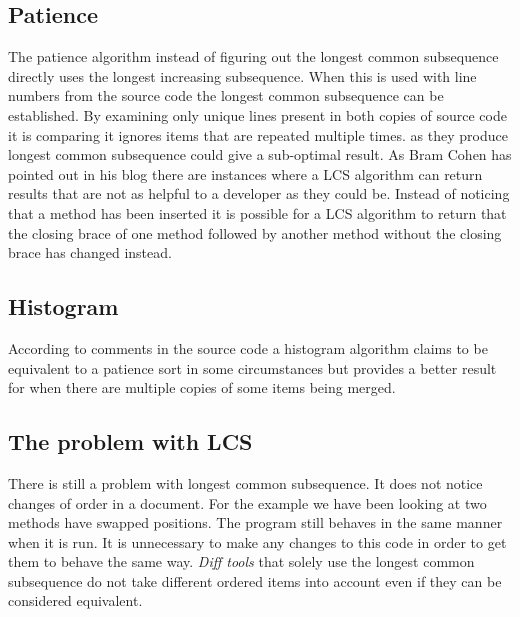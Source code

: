 
\subsection{Patience}
The patience algorithm instead of figuring out the longest common subsequence directly uses the longest increasing subsequence.
When this is used with line numbers from the source code the longest common subsequence can be established.
By examining only unique lines present in both copies of source code it is comparing it ignores items that are repeated multiple times.  as they produce longest common subsequence could give a sub-optimal result.
As Bram Cohen has pointed out in his blog there are instances where a LCS algorithm can return results that are not as helpful to a developer as they could be.  Instead of noticing that a method has been inserted it is possible for a LCS algorithm to return that the closing brace of one method followed by another method without the closing brace has changed instead.  
% 
% 

\subsection{Histogram}
According to comments in the source code a histogram algorithm claims to be equivalent to a patience sort in some circumstances but provides a better result for when there are multiple copies of some items being merged. 


\subsection{The problem with LCS}
There is still a problem with longest common subsequence. It does not notice changes of order in a document.  For the example we have been looking at two methods have swapped positions.  The program still behaves in the same manner when it is run.  It is unnecessary to make any changes to this code in order to get them to behave the same way. \emph{Diff tools} that solely use the longest common subsequence do not take different ordered items into account even if they can be considered equivalent.

